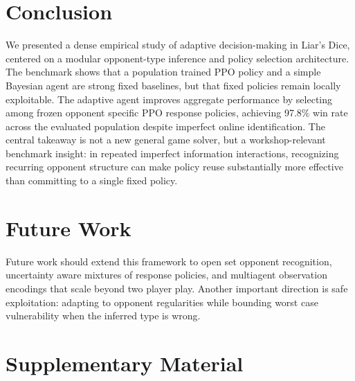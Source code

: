\documentclass[letterpaper]{article} %
\begin{document}
\section{Conclusion}
We presented a dense empirical study of adaptive decision-making in Liar's Dice, centered on a modular opponent-type inference and policy selection architecture. The benchmark shows that a population trained PPO policy and a simple Bayesian agent are strong fixed baselines, but that fixed policies remain locally exploitable. The adaptive agent improves aggregate performance by selecting among frozen opponent specific PPO response policies, achieving 97.8\% win rate across the evaluated population despite imperfect online identification. The central takeaway is not a new general game solver, but a workshop-relevant benchmark insight: in repeated imperfect information interactions, recognizing recurring opponent structure can make policy reuse substantially more effective than committing to a single fixed policy.

\section{Future Work}
Future work should extend this framework to open set opponent recognition, uncertainty aware mixtures of response policies, and multiagent observation encodings that scale beyond two player play. Another important direction is safe exploitation: adapting to opponent regularities while bounding worst case vulnerability when the inferred type is wrong.

\clearpage




\clearpage
\section*{Supplementary Material}

\end{document}
